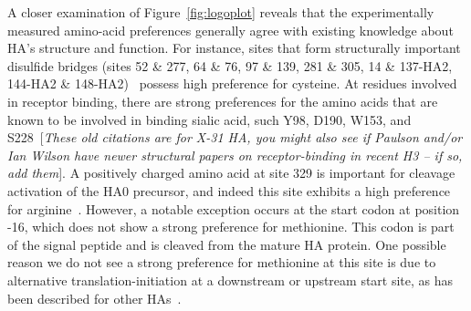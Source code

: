 \documentclass[9pt,twocolumn,twoside]{pnas-new}
\newcommand{\comment}[1]{{\color{red}[\textsl{#1}]}}
\begin{document}
A closer examination of Figure~\ref{fig:logoplot} reveals that the experimentally measured amino-acid preferences generally agree with existing knowledge about HA's structure and function.
For instance, sites that form structurally important disulfide bridges (sites 52 \& 277, 64 \& 76, 97 \& 139, 281 \& 305, 14 \& 137-HA2, 144-HA2 \& 148-HA2)~\cite{waterfield1981disulphide} possess high preference for cysteine.
At residues involved in receptor binding, there are strong preferences for the amino acids that are known to be involved in binding sialic acid, such Y98, D190, W153, and S228~\cite{weis1988structure,martin1998studies}\comment{These old citations are for X-31 HA, you might also see if Paulson and/or Ian Wilson have newer structural papers on receptor-binding in recent H3 -- if so, add them}.
A positively charged amino acid at site 329 is important for cleavage activation of the HA0 precursor, and indeed this site exhibits a high preference for arginine~\cite{kido1992isolation, stech2005new}.
However, a notable exception occurs at the start codon at position -16, which does not show a strong preference for methionine. 
This codon is part of the signal peptide and is cleaved from the mature HA protein.
One possible reason we do not see a strong preference for methionine at this site is due to alternative translation-initiation at a downstream or upstream start site, as has been described for other HAs~\cite{girard2011upstream}.
\end{document}

